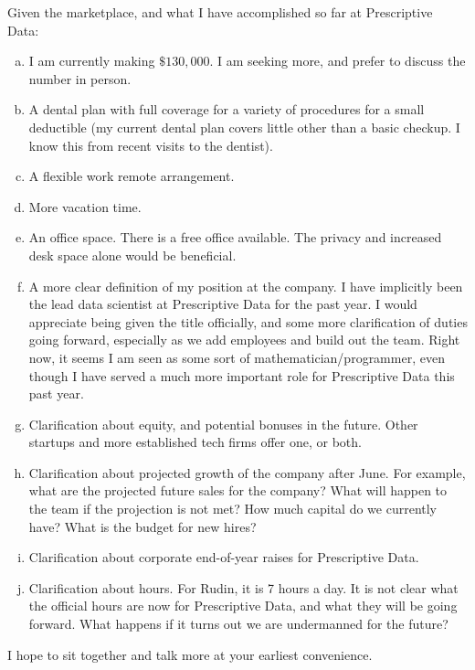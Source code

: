 \documentclass[12pt]{article}
\author{David Karapetyan}
\begin{document}
Given the marketplace, and what I have accomplished so far at
Prescriptive Data:

\begin{enumerate}[a)]
	\item I am currently making $\$130,000$. 
	I am seeking more, and prefer to discuss the number in person.
\item A dental plan with full coverage for a variety of procedures for a small
	deductible (my current dental plan covers little other than a basic checkup. I
	know this from recent visits to the dentist).
\item A flexible work remote arrangement. 
\item More vacation time.
\item An office space. There is a free office available. The privacy and increased
	desk space alone would be beneficial. 
\item A more clear definition of my position at the company. I have 
	implicitly been the lead data scientist at Prescriptive Data for the past year.
	I would appreciate being given the title officially, and some more
	clarification of duties going forward, especially as we add employees and
	build out the team. Right now, it seems I am
	seen as some sort of mathematician/programmer, even though I have
	served a much more important role for Prescriptive Data this past year.
\item Clarification about equity, and potential bonuses in the future. Other
	startups and more established tech firms offer one, or both.
\item Clarification about projected growth of the company after June. For
	example, what are the projected future sales for the company? What will happen
	to the team if the projection is not met? How much capital do we currently
	have? What is the budget for new hires?
\item Clarification about corporate end-of-year raises for Prescriptive Data. 
\item Clarification about hours. For Rudin, it is 7 hours a day. It is not clear
	what the official hours are now for Prescriptive Data, and what they will
	be going forward. What happens if it turns out we are undermanned for the future?
\end{enumerate}

I hope to sit together and talk more at your earliest convenience. 
\end{document}
